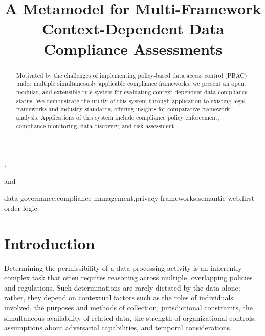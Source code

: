 \documentclass{IOS-Book-Article}
\begin{document}
\pagestyle{headings}
\begin{frontmatter}

\title{A Metamodel for Multi-Framework Context-Dependent Data Compliance Assessments}

\author[A]{ },
\author[B]{ }
and
\author[C]{ }

\address[A]{University of Sussex, Brighton, United Kingdom}
\address[B]{Immuta Research, Boston, Massachusetts, USA}
\address[C]{Brussels Privacy Hub, Vrije Universiteit Brussel, Brussels, Belgium}

\begin{abstract}
Motivated by the challenges of implementing policy-based data access control (PBAC) under multiple simultaneously applicable compliance frameworks, we present an open, modular, and extensible rule system for evaluating context-dependent data compliance status. We demonstrate the utility of this system through application to existing legal frameworks and industry standards, offering insights for comparative framework analysis. Applications of this system include compliance policy enforcement, compliance monitoring, data discovery, and risk assessment.
\end{abstract}

\begin{keyword}
data governance\sep compliance management\sep privacy frameworks\sep semantic web\sep first-order logic
\end{keyword}

\end{frontmatter}

\section{Introduction}\label{sec:introduction}


Determining the permissibility of a data processing activity is an inherently complex task that often requires reasoning across multiple, overlapping policies and regulations. Such determinations are rarely dictated by the data alone; rather, they depend on contextual factors such as the roles of individuals involved, the purposes and methods of collection, jurisdictional constraints, the simultaneous availability of related data, the strength of organizational controls, assumptions about adversarial capabilities, and temporal considerations.
\end{document}
